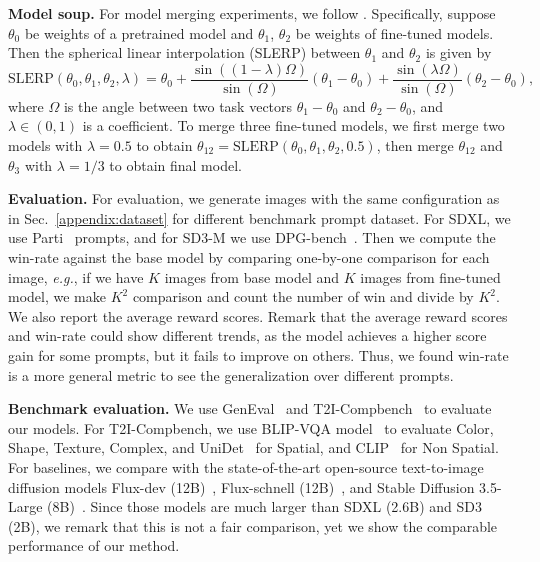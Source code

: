 \vspace{0.05in}
\noindent
{\bf Model soup.}
For model merging experiments, we follow \citep{rame2024warp}. Specifically, suppose $\theta_0$ be weights of a pretrained model and $\theta_1$, $\theta_2$ be weights of fine-tuned models. Then the spherical linear interpolation (SLERP) between $\theta_1$ and $\theta_2$ is given by 
\begin{equation}
    \textrm{SLERP}(\theta_0, \theta_1, \theta_2, \lambda) = \theta_0 + \frac{\sin ((1-\lambda)\Omega)}{\sin (\Omega)} (\theta_1 - \theta_0) + \frac{\sin (\lambda \Omega)}{\sin (\Omega)}(\theta_2 - \theta_0)\text{,}
\end{equation}
where $\Omega$ is the angle between two task vectors $\theta_1 - \theta_0$ and $\theta_2 - \theta_0$, and $\lambda \in (0,1)$ is a coefficient. 
To merge three fine-tuned models, we first merge two models with $\lambda=0.5$ to obtain $\theta_{12} = \textrm{SLERP}(\theta_0, \theta_1, \theta_2, 0.5)$, then merge $\theta_{12}$ and $\theta_3$ with $\lambda = 1/3$ to obtain final model.

\vspace{0.05in}
\noindent
{\bf Evaluation.}
For evaluation, we generate images with the same configuration as in Sec.~\ref{appendix:dataset} for different benchmark prompt dataset.
For SDXL, we use Parti~\citep{yu2022scaling} prompts, and for SD3-M we use DPG-bench~\citep{hu2024ella}. 
Then we compute the win-rate against the base model by comparing one-by-one comparison for each image, \emph{e.g.}, if we have $K$ images from base model and $K$ images from fine-tuned model, we make $K^2$ comparison and count the number of win and divide by $K^2$.
We also report the average reward scores.
Remark that the average reward scores and win-rate could show different trends, as the model achieves a higher score gain for some prompts, but it fails to improve on others. Thus, we found win-rate is a more general metric to see the generalization over different prompts.

\vspace{0.05in}
\noindent
{\bf Benchmark evaluation.}
We use GenEval~\citep{ghosh2024geneval} and T2I-Compbench~\citep{huang2023t2i} to evaluate our models. 
For T2I-Compbench, we use BLIP-VQA model~\citep{li2022blip} to evaluate Color, Shape, Texture, Complex, and UniDet~\citep{zhou2022simple} for Spatial, and CLIP~\citep{radford2021learning} for Non Spatial. 
For baselines, we compare with the state-of-the-art open-source text-to-image diffusion models Flux-dev (12B)~\citep{flux2024},  Flux-schnell (12B)~\citep{flux2024}, and Stable Diffusion 3.5-Large (8B)~\citep{esser2024scaling}. 
Since those models are much larger than SDXL (2.6B) and SD3 (2B), we remark that this is not a fair comparison, yet we show the comparable performance of our method.


